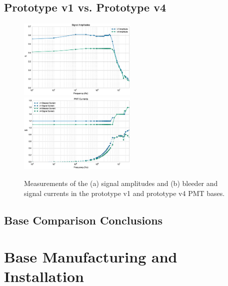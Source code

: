 \subsection{Prototype v1 vs. Prototype v4}

\begin{figure}[h]
	\centerline{
		\mbox{\includegraphics[width=0.5\textwidth]{figures/Test_v4_Amp.eps} \includegraphics[width=0.5\textwidth]{figures/Test_v4_Current.eps}}}
	\caption{Measurements of the (a) signal amplitudes and (b) bleeder and signal currents in the prototype v1 and prototype v4 PMT bases.}
	\label{fig:test-v4}
\end{figure}

\subsection{Base Comparison Conclusions}

\section{Base Manufacturing and Installation}
